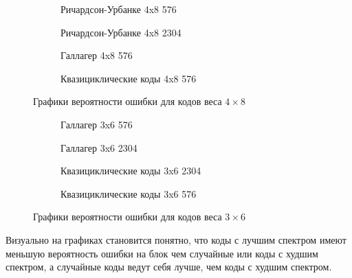 \begin{figure}[h!]
\centering
\begin{subfigure}{.5\textwidth}
  \centering
  \caption{Ричардсон-Урбанке 4x8 576}
\end{subfigure}%
\begin{subfigure}{.5\textwidth}
  \centering
  \caption{Ричардсон-Урбанке 4x8 2304}
\end{subfigure}


\begin{subfigure}{.5\textwidth}
  \centering
  \caption{Галлагер 4x8 576}
\end{subfigure}%
\begin{subfigure}{.5\textwidth}
  \centering
  \caption{Квазициклические коды 4x8 576}
\end{subfigure}

\caption{Графики вероятности ошибки для кодов веса $4 \times 8$}
\end{figure}

\begin{figure}[h!]
\centering
\begin{subfigure}{.5\textwidth}
  \centering
  \caption{Галлагер 3x6 576}
\end{subfigure}%
\begin{subfigure}{.5\textwidth}
  \centering
  \caption{Галлагер 3x6 2304}
\end{subfigure}

\begin{subfigure}{.5\textwidth}
  \centering
  \caption{Квазициклические коды 3x6 2304}
\end{subfigure}%
\begin{subfigure}{.5\textwidth}
  \centering
  \caption{Квазициклические коды 3x6 576}
\end{subfigure}

\caption{Графики вероятности ошибки для кодов веса $3 \times 6$}
\end{figure}

Визуально на графиках становится понятно, что коды с лучшим спектром имеют меньшую вероятность ошибки
на блок чем случайные или коды с худшим спектром, а случайные коды ведут себя лучше, чем коды с
худшим спектром.

